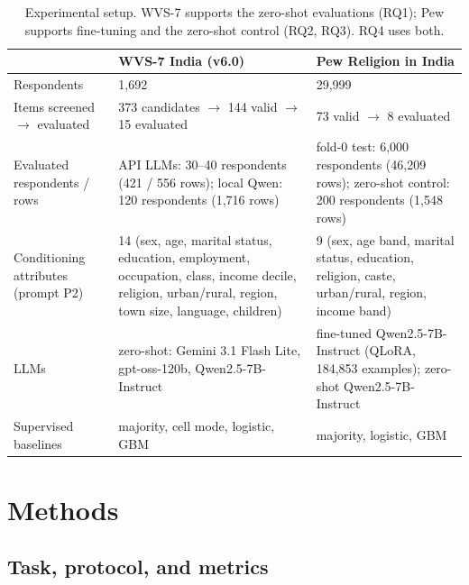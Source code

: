 \documentclass[conference]{IEEEtran}
\begin{document}
\begin{table}[!t]
\caption{Experimental setup. WVS-7 supports the zero-shot evaluations (RQ1); Pew supports fine-tuning and the zero-shot control (RQ2, RQ3). RQ4 uses both.}
\label{tab:setup}
\centering
\footnotesize
\begin{tabular}{@{}p{3.3cm}p{6.7cm}p{6.7cm}@{}}
\toprule
 & \textbf{WVS-7 India (v6.0)} & \textbf{Pew Religion in India} \\
\midrule
Respondents & 1{,}692 & 29{,}999 \\
Items screened $\rightarrow$ evaluated & 373 candidates $\rightarrow$ 144 valid $\rightarrow$ 15 evaluated & 73 valid $\rightarrow$ 8 evaluated \\
Evaluated respondents / rows & API LLMs: 30--40 respondents (421 / 556 rows); local Qwen: 120 respondents (1{,}716 rows) & fold-0 test: 6{,}000 respondents (46{,}209 rows); zero-shot control: 200 respondents (1{,}548 rows) \\
Conditioning attributes (prompt P2) & 14 (sex, age, marital status, education, employment, occupation, class, income decile, religion, urban/rural, region, town size, language, children) & 9 (sex, age band, marital status, education, religion, caste, urban/rural, region, income band) \\
LLMs & zero-shot: Gemini 3.1 Flash Lite, gpt-oss-120b, Qwen2.5-7B-Instruct & fine-tuned Qwen2.5-7B-Instruct (QLoRA, 184{,}853 examples); zero-shot Qwen2.5-7B-Instruct \\
Supervised baselines & majority, cell mode, logistic, GBM & majority, logistic, GBM \\
\bottomrule
\end{tabular}
\end{table}

\section{Methods}

\subsection{Task, protocol, and metrics}
\end{document}
